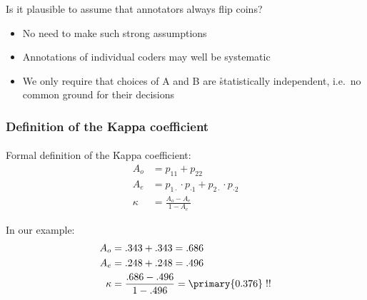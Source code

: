 \documentclass[t]{beamer} %
\begin{document}
\begin{frame}[c]
  \frametitle{}

  \gap[1]
  \begin{center}
    \Large
     Is it plausible to assume that annotators always flip coins?
  \end{center}

  \gap[1.5]\pause
  \begin{itemize}
  \item No need to make such strong assumptions
  \item Annotations of individual coders may well be systematic
  \item We only require that choices of A and B are \h{statistically
      independent}, i.e.\ no common ground for their decisions
  \end{itemize}
\end{frame}

\begin{frame}
  \frametitle{Definition of the Kappa coefficient}
  \framesubtitle{\citep{Cohen:60}}

  Formal definition of the \h{Kappa} coefficient:
  \begin{align*}
    A_o &= p_{11} + p_{22} \\[3mm]
    A_e &= p_{1\cdot}\cdot p_{\cdot 1} + p_{2\cdot}\cdot p_{\cdot 2} \\[3mm]
    \kappa &= \frac{A_o - A_e}{1 - A_e}
  \end{align*}

  \gap[1]\pause
  In our example:
  \ungap[2.2]
  \begin{align*}
    A_o &= .343 + .343 = .686 \\
    A_e &= .248 + .248 = .496 \\
    \kappa &= \frac{.686 - .496}{1 - .496} = \primary{0.376}\; !!
  \end{align*}
\end{frame}
\end{document}
